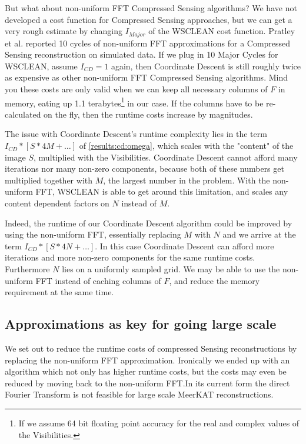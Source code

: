 But what about non-uniform FFT Compressed Sensing algorithms? We have not developed a cost function for Compressed Sensing approaches, but we can get a very rough estimate by changing $I_{Major}$ of the WSCLEAN cost function. Pratley et al.\cite{pratley2018fast} reported 10 cycles of non-uniform FFT approximations for a Compressed Sensing reconstruction on simulated data. If we plug in 10 Major Cycles for WSCLEAN, assume $I_{CD}=1$ again, then Coordinate Descent is still roughly twice as expensive as other non-uniform FFT Compressed Sensing algorithms. Mind you these costs are only valid when we can keep all necessary columns of $F$ in memory, eating up 1.1 terabytes\footnote{If we assume 64 bit floating point accuracy for the real and complex values of the Visibilities.} in our case. If the columns have to be re-calculated on the fly, then the runtime costs increase by magnitudes.

The issue with Coordinate Descent's runtime complexity lies in the term $I_{CD} * [S * 4M +\ldots]$ of \eqref{results:cd:omega}, which scales with the "content" of the image $S$, multiplied with the Visibilities. Coordinate Descent cannot afford many iterations nor many non-zero components, because both of these numbers get multiplied together with $M$, the largest number in the problem. With the non-uniform FFT, WSCLEAN is able to get around this limitation, and scales any content dependent factors on $N$ instead of $M$. 

Indeed, the runtime of our Coordinate Descent algorithm could be improved by using the non-uniform FFT, essentially replacing $M$ with $N$ and we arrive at the term $I_{CD} * [S * 4N +\ldots]$. In this case Coordinate Descent can afford more iterations and more non-zero components for the same runtime costs. Furthermore $N$ lies on a uniformly sampled grid. We may be able to use the non-uniform FFT instead of caching columns of $F$, and reduce the memory requirement at the same time.


\subsection{Approximations as key for going large scale}
We set out to reduce the runtime costs of compressed Sensing reconstructions by replacing the non-uniform FFT approximation. Ironically we ended up with an algorithm which not only has higher runtime costs, but the costs may even be reduced by moving back to the non-uniform FFT.In its current form the direct Fourier Transform is not feasible for large scale MeerKAT reconstructions.

